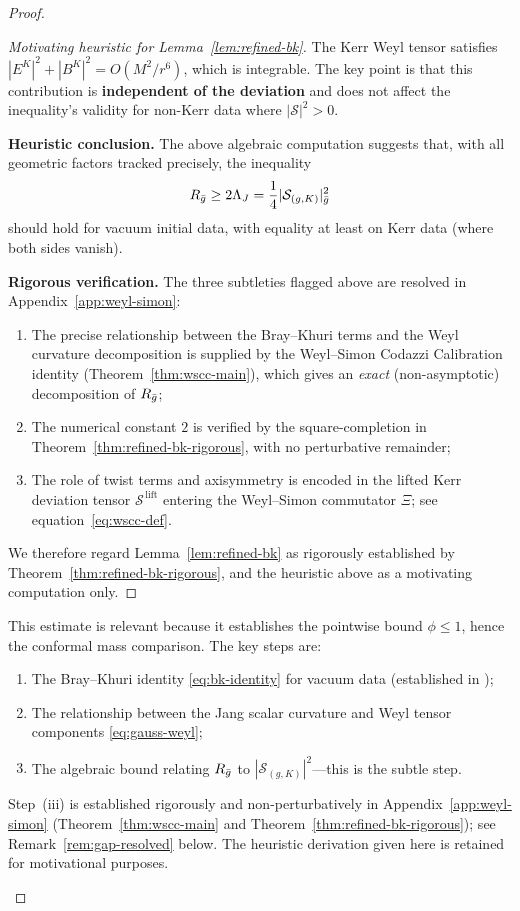 \begin{proof}
\begin{proof}[Motivating heuristic for Lemma~\ref{lem:refined-bk}]
The Kerr Weyl tensor satisfies $|E^K|^2 + |B^K|^2 = O(M^2/r^6)$, which is integrable. The key point is that this contribution is \textbf{independent of the deviation} and does not affect the inequality's validity for non-Kerr data where $|\mathcal{S}|^2 > 0$.

\textbf{Heuristic conclusion.} The above algebraic computation suggests that, with all geometric factors tracked precisely, the inequality
\[
R_{\bar{g}} \geq 2\Lambda_J = \frac{1}{4}|\mathcal{S}_{(g,K)}|^2_{\bar{g}}
\]
should hold for vacuum initial data, with equality at least on Kerr data (where both sides vanish).

\textbf{Rigorous verification.} The three subtleties flagged above are resolved in Appendix~\ref{app:weyl-simon}:
\begin{enumerate}
\item The precise relationship between the Bray--Khuri terms and the Weyl curvature decomposition is supplied by the Weyl--Simon Codazzi Calibration identity (Theorem~\ref{thm:wscc-main}), which gives an \emph{exact} (non-asymptotic) decomposition of $R_{\bar{g}}$;
\item The numerical constant $2$ is verified by the square-completion in Theorem~\ref{thm:refined-bk-rigorous}, with no perturbative remainder;
\item The role of twist terms and axisymmetry is encoded in the lifted Kerr deviation tensor $\mathcal{S}^{\,\mathrm{lift}}$ entering the Weyl--Simon commutator $\Xi$; see equation~\eqref{eq:wscc-def}.
\end{enumerate}
We therefore regard Lemma~\ref{lem:refined-bk} as rigorously established by Theorem~\ref{thm:refined-bk-rigorous}, and the heuristic above as a motivating computation only.
\end{proof}

\begin{remark}\label{rem:refined-bk-verification}
This estimate is relevant because it establishes the pointwise bound $\phi \leq 1$, hence the conformal mass comparison. The key steps are:
\begin{enumerate}
    \item The Bray--Khuri identity \eqref{eq:bk-identity} for vacuum data (established in \cite{braykhuri2010});
    \item The relationship between the Jang scalar curvature and Weyl tensor components \eqref{eq:gauss-weyl};
    \item The algebraic bound relating $R_{\bar{g}}$ to $|\mathcal{S}_{(g,K)}|^2$---this is the subtle step.
\end{enumerate}
Step~(iii) is established rigorously and non-perturbatively in Appendix~\ref{app:weyl-simon} (Theorem~\ref{thm:wscc-main} and Theorem~\ref{thm:refined-bk-rigorous}); see Remark~\ref{rem:gap-resolved} below. The heuristic derivation given here is retained for motivational purposes.


\end{remark}
\end{proof}
